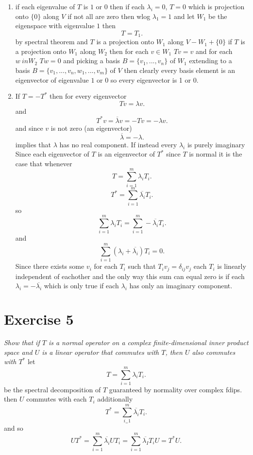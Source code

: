\documentclass{article}
\begin{document}
\begin{enumerate}[label = (\alph*)]
            \item if each eigenvalue of $T$ is $1$ or $0$ then  if each $\lambda_i = 0$, $T = 0$ which is projection onto  $\{0\}$ along
                $V$ if not all are zero then wlog $\lambda_1 = 1$ and let $W_1$ be the eigenspace with eigenvalue $1$ then
                \[
                    T = T_1
                .\] 
                by spectral theorem and $T$ is a projection onto $W_1$ along $V - W_1 + \{0\}$
                if $T$ is a projection onto $W_1$ along $W_2$ then for each $v \in W_1$ $Tv  = v$ and for each  $w \ in W_2$ $Tw = 0$ and
                picking a basis $B = \{v_1,...,v_n\}$ of $W_1$ extending to a basis $B =\{v_1,...,v_n,w_1,...,v_m\}$ of $V$ then clearly 
                every basis element is an eigenvector of eigenvalue  $1$ or $0$ so every eigenvector is 1 or 0.
            \item If $T = -T^{*}$ then for every eigenvector
                \[
                Tv = \lambda v
                .\] 
                and
                \[
                T^{*}v = \overline{\lambda}v = -Tv = -\lambda v
                .\] 
                and since $v$ is not zero (an eigenvector)
                \[
                \overline{\lambda} = -\lambda
                .\] 
                implies that $\lambda$ has no real component. If instead every $\lambda_i$ is purely imaginary
                Since each eigenvector of  $T$ is an eigenvector of $T^{*}$ since $T$ is normal it is the case that whenever
                \[
                T = \sum_{i=1}^{m}\lambda_iT_i
                .\] 
                \[
                T^{*} = \sum_{i=1}^{m}\overline{\lambda_i}T_i
                .\] 
                so
                \[
                \sum_{i=1}^{m}\lambda_iT_i = \sum_{i=1}^{m}-\overline{\lambda_i}T_i
                .\] 
                and
                \[
                \sum_{i=1}^{m}(\lambda_i+\overline{\lambda_i})T_i = 0
                .\] 
                Since there exists some $v_i$ for each $T_i$ such that $T_iv_j = \delta_{ij}v_j$ each $T_i$ is linearly independent of eachother and
                the only way this sum can equal zero is if each $\lambda_i = -\overline{\lambda_i}$ which is only true if each $\lambda_i$ has only an imaginary component.
        \end{enumerate}

        \section{Exercise 5}
        \emph{
            Show that if $T$ is a normal operator on a complex finite-dimensional inner
            product space and $U$ is a linear operator that commutes with $T$, then $U$ also commutes with $T^{*}$
        }
        let
        \[
        T = \sum_{i=1}^{m}\lambda_iT_i
        .\] 
        be the spectral decomposition of $T$ guaranteed by normality over complex fdips. then $U$ commutes with each $T_i$
        additionally 
        \[
        T^{*} = \sum_{i_=1}^{m}\overline{\lambda_i}T_i
        .\] 
        and so
        \[
        UT^{*} = \sum_{i=1}^{m}\overline{\lambda_i}UT_i = \sum_{i=1}^{m}\overline{\lambda_I}T_iU = T^{*}U
        .\] 
\end{document}

